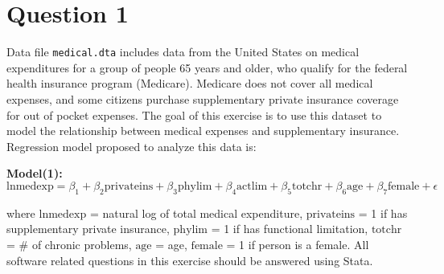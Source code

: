 \documentclass[12pt,a4paper]{article}
\begin{document}
\newpage

\section*{Question 1}
Data file \texttt{medical.dta} includes data from the United States on medical expenditures for a group of people 65 years and older, who qualify for the federal health insurance program (Medicare). Medicare does not cover all medical expenses, and some citizens purchase supplementary private insurance coverage for out of pocket expenses. The goal of this exercise is to use this dataset to model the relationship between medical expenses and supplementary insurance. Regression model proposed to analyze this data is:

\textbf{Model(1):} 
\[
\text{lnmedexp} = \beta_1 + \beta_2\text{privateins} + \beta_3\text{phylim} + \beta_4\text{actlim} + \beta_5\text{totchr} + \beta_6\text{age} + \beta_7\text{female} + \epsilon
\]

where $\text{lnmedexp}$ = natural log of total medical expenditure, $\text{privateins}$ = 1 if has supplementary private insurance, $\text{phylim}$ = 1 if has functional limitation, $\text{totchr}$ = \# of chronic problems, $\text{age}$ = age, $\text{female}$ = 1 if person is a female. All software related questions in this exercise should be answered using Stata.
\end{document}
